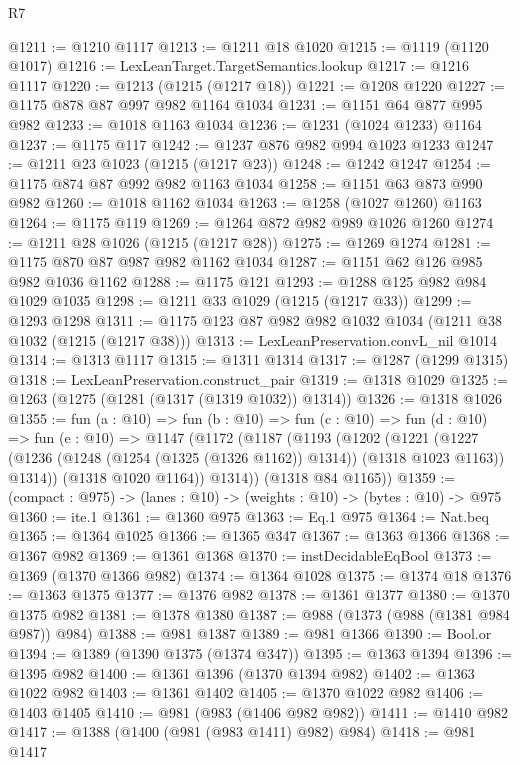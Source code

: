 \begin{lexlean}{R7}
\begin{coremodule}
@1211 := @1210 @1117
@1213 := @1211 @18 @1020
@1215 := @1119 (@1120 @1017)
@1216 := LexLeanTarget.TargetSemantics.lookup
@1217 := @1216 @1117
@1220 := @1213 (@1215 (@1217 @18))
@1221 := @1208 @1220
@1227 := @1175 @878 @87 @997 @982 @1164 @1034
@1231 := @1151 @64 @877 @995 @982
@1233 := @1018 @1163 @1034
@1236 := @1231 (@1024 @1233) @1164
@1237 := @1175 @117
@1242 := @1237 @876 @982 @994 @1023 @1233
@1247 := @1211 @23 @1023 (@1215 (@1217 @23))
@1248 := @1242 @1247
@1254 := @1175 @874 @87 @992 @982 @1163 @1034
@1258 := @1151 @63 @873 @990 @982
@1260 := @1018 @1162 @1034
@1263 := @1258 (@1027 @1260) @1163
@1264 := @1175 @119
@1269 := @1264 @872 @982 @989 @1026 @1260
@1274 := @1211 @28 @1026 (@1215 (@1217 @28))
@1275 := @1269 @1274
@1281 := @1175 @870 @87 @987 @982 @1162 @1034
@1287 := @1151 @62 @126 @985 @982 @1036 @1162
@1288 := @1175 @121
@1293 := @1288 @125 @982 @984 @1029 @1035
@1298 := @1211 @33 @1029 (@1215 (@1217 @33))
@1299 := @1293 @1298
@1311 := @1175 @123 @87 @982 @982 @1032 @1034 (@1211 @38 @1032 (@1215 (@1217 @38)))
@1313 := LexLeanPreservation.convL_nil @1014
@1314 := @1313 @1117
@1315 := @1311 @1314
@1317 := @1287 (@1299 @1315)
@1318 := LexLeanPreservation.construct_pair
@1319 := @1318 @1029
@1325 := @1263 (@1275 (@1281 (@1317 (@1319 @1032)) @1314))
@1326 := @1318 @1026
@1355 := fun (a : @10) =>
  fun (b : @10) =>
  fun (c : @10) =>
  fun (d : @10) =>
  fun (e : @10) =>
  @1147
    (@1172
      (@1187
        (@1193
          (@1202
            (@1221
              (@1227 (@1236 (@1248 (@1254 (@1325 (@1326 @1162)) @1314)) (@1318 @1023 @1163)) @1314))
            (@1318 @1020 @1164))
          @1314))
      (@1318 @84 @1165))
@1359 := (compact : @975) -> (lanes : @10) -> (weights : @10) -> (bytes : @10) -> @975
@1360 := ite.{1}
@1361 := @1360 @975
@1363 := Eq.{1} @975
@1364 := Nat.beq
@1365 := @1364 @1025
@1366 := @1365 @347
@1367 := @1363 @1366
@1368 := @1367 @982
@1369 := @1361 @1368
@1370 := instDecidableEqBool
@1373 := @1369 (@1370 @1366 @982)
@1374 := @1364 @1028
@1375 := @1374 @18
@1376 := @1363 @1375
@1377 := @1376 @982
@1378 := @1361 @1377
@1380 := @1370 @1375 @982
@1381 := @1378 @1380
@1387 := @988 (@1373 (@988 (@1381 @984 @987)) @984)
@1388 := @981 @1387
@1389 := @981 @1366
@1390 := Bool.or
@1394 := @1389 (@1390 @1375 (@1374 @347))
@1395 := @1363 @1394
@1396 := @1395 @982
@1400 := @1361 @1396 (@1370 @1394 @982)
@1402 := @1363 @1022 @982
@1403 := @1361 @1402
@1405 := @1370 @1022 @982
@1406 := @1403 @1405
@1410 := @981 (@983 (@1406 @982 @982))
@1411 := @1410 @982
@1417 := @1388 (@1400 (@981 (@983 @1411) @982) @984)
@1418 := @981 @1417

\end{coremodule}
\end{lexlean}
